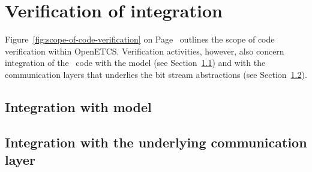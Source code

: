 
\chapter{Verification of integration}
\label{cha:integration}

Figure~\ref{fig:scope-of-code-verification} on Page~\pageref{fig:scope-of-code-verification}
outlines the scope of code verification within OpenETCS.
Verification activities, however, also concern integration of the \isoc~code
with the \scade model (see Section~\ref{sec:integration-with-model})
and with the communication layers that underlies the bit stream abstractions
(see Section~\ref{sec:integration-with-communication}).

\section{Integration with \scade model}
\label{sec:integration-with-model}

\section{Integration with the underlying communication layer}
\label{sec:integration-with-communication}


